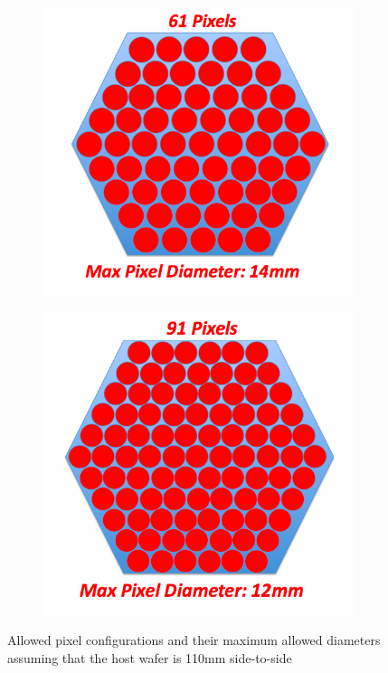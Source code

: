 \documentclass[12pt, titlepage]{article} %
\begin{document}
\begin{figure}[H]
	\begin{subfigure}{0.5\textwidth}
		\centering
		\includegraphics[width=\linewidth]{PNG/61pixels}
	\end{subfigure}%
	\begin{subfigure}{0.5\textwidth}
		\centering
		\includegraphics[width=\linewidth]{PNG/79pixels}
	\end{subfigure}
	
\caption{Allowed pixel configurations and their maximum allowed diameters assuming that the host wafer is 110mm side-to-side \label{fig:hexQuant}}
\end{figure}
\end{document}
